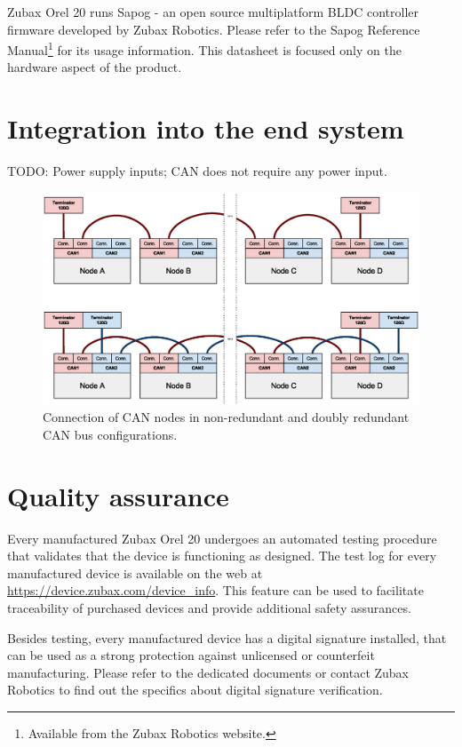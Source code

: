 \documentclass{zubaxdoc}
\begin{document}
Zubax Orel 20 runs Sapog - an open source multiplatform BLDC controller firmware
developed by Zubax Robotics.
Please refer to the Sapog Reference Manual\footnote{Available from the Zubax Robotics website.}
for its usage information.
This datasheet is focused only on the hardware aspect of the product.

\section{Integration into the end system}

TODO: Power supply inputs; CAN does not require any power input.

\begin{figure}[hb]
    \centering
	\includegraphics[width=\textwidth]{can_daisy_chain}
	\caption{Connection of CAN nodes in non-redundant and doubly redundant CAN bus configurations.
	\label{can_daisy_chain_non_redundant}}
\end{figure}

\section{Quality assurance}

Every manufactured Zubax Orel 20 undergoes an automated testing procedure that validates that
the device is functioning as designed.
The test log for every manufactured device is available on the web at
\url{https://device.zubax.com/device_info}.
This feature can be used to facilitate traceability of purchased devices and
provide additional safety assurances.

Besides testing, every manufactured device has a digital signature installed,
that can be used as a strong protection against unlicensed or counterfeit manufacturing.
Please refer to the dedicated documents or contact Zubax Robotics to find out
the specifics about digital signature verification.
\end{document}
